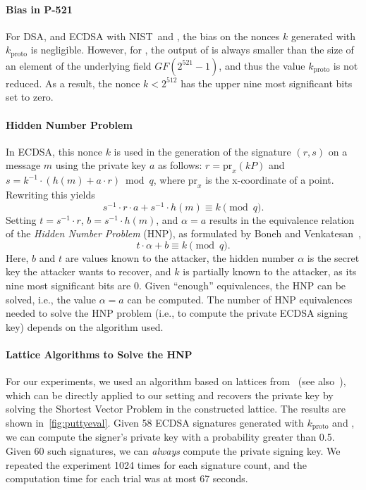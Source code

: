 \paragraph{Bias in P-521}

For DSA, and ECDSA with NIST~\ptwofivesix and \pthreeeightfour, the bias on the nonces $k$ generated with $k_\text{proto}$ is negligible. However, for \pfivetwoone, the output of \shafiveonetwo is always smaller than the size of an element of the underlying field $GF(2^{521}-1)$, and thus the value $k_\text{proto}$ is not reduced. As a result, the nonce $k < 2^{512}$ has the upper nine most significant bits set to zero. 

\paragraph{Hidden Number Problem}

In ECDSA, this nonce $k$ is used in the generation of the signature $(r,s)$ on a message $m$ using the private key $a$ as follows: $r = \text{pr}_x(kP)$ and $s = k^{-1} \cdot (h(m)+a \cdot r) \bmod q$, where $\text{pr}_x$ is the x-coordinate of a point. Rewriting this yields
$$
s^{-1} \cdot r \cdot a + s^{-1}\cdot h(m) \equiv k   \pmod q.
$$
Setting $t = s^{-1} \cdot r$, $b = s^{-1}\cdot h(m)$,  and $\alpha = a$ results in the equivalence relation of the \emph{Hidden Number Problem} (HNP), as formulated by Boneh and Venkatesan~\cite{C:BonVen96},
$$
t \cdot \alpha + b \equiv k \pmod q.
$$
Here, $b$ and $t$ are values known to the attacker, the hidden number $\alpha$ is the secret key the attacker wants to recover, and $k$ is partially known to the attacker, as its nine most significant bits are $0$. Given ``enough'' equivalences, the HNP can be solved, i.e., the value $\alpha = a$ can be computed. The number of HNP equivalences needed to solve the HNP problem (i.e., to compute the private ECDSA signing key) depends on the algorithm used.
 
\paragraph{Lattice Algorithms to Solve the HNP}

For our experiments, we used an algorithm based on lattices from~\cite[USVPPredSieve]{EC:AlbHen21} (see also~\cite{FC:BreHen19}), which can be directly applied to our setting and recovers the private key by solving the Shortest Vector Problem in the constructed lattice. The results are shown in~\autoref{fig:puttyeval}. Given 58 ECDSA signatures generated with $k_\text{proto}$ and \pfivetwoone, we can compute the signer's private key with a probability greater than 0.5. Given 60 such signatures, we can \emph{always} compute the private signing key. We repeated the experiment 1024 times for each signature count, and the computation time for each trial was at most 67 seconds.

